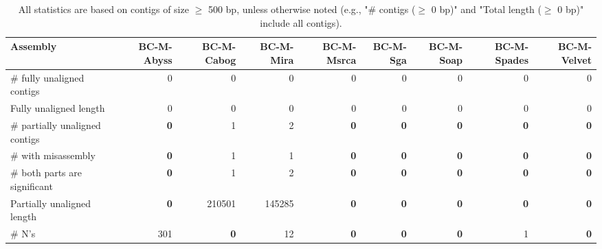 \documentclass[12pt,a4paper]{article}
\begin{document}
\begin{table}[ht]
\begin{center}
\caption{All statistics are based on contigs of size $\geq$ 500 bp, unless otherwise noted (e.g., "\# contigs ($\geq$ 0 bp)" and "Total length ($\geq$ 0 bp)" include all contigs).}
\begin{tabular}{|l*{8}{|r}|}
\hline
Assembly & BC-M-Abyss & BC-M-Cabog & BC-M-Mira & BC-M-Msrca & BC-M-Sga & BC-M-Soap & BC-M-Spades & BC-M-Velvet \\ \hline
\# fully unaligned contigs & 0 & 0 & 0 & 0 & 0 & 0 & 0 & 0 \\ \hline
Fully unaligned length & 0 & 0 & 0 & 0 & 0 & 0 & 0 & 0 \\ \hline
\# partially unaligned contigs & {\bf 0} & 1 & 2 & {\bf 0} & {\bf 0} & {\bf 0} & {\bf 0} & {\bf 0} \\ \hline
\hspace{5mm}\# with misassembly & {\bf 0} & 1 & 1 & {\bf 0} & {\bf 0} & {\bf 0} & {\bf 0} & {\bf 0} \\ \hline
\hspace{5mm}\# both parts are significant & {\bf 0} & 1 & 2 & {\bf 0} & {\bf 0} & {\bf 0} & {\bf 0} & {\bf 0} \\ \hline
Partially unaligned length & {\bf 0} & 210501 & 145285 & {\bf 0} & {\bf 0} & {\bf 0} & {\bf 0} & {\bf 0} \\ \hline
\# N's & 301 & {\bf 0} & 12 & {\bf 0} & {\bf 0} & {\bf 0} & 1 & {\bf 0} \\ \hline
\end{tabular}
\end{center}
\end{table}
\end{document}
